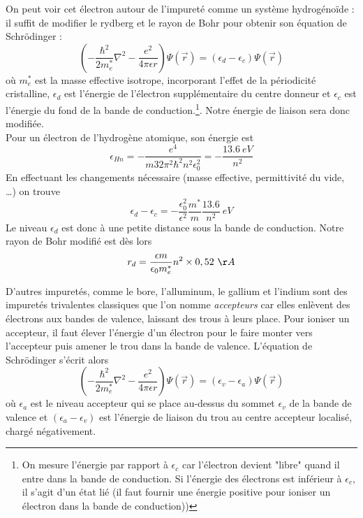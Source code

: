 		On peut voir cet électron autour de l'impureté comme un système hydrogénoïde : 
		il suffit de modifier le rydberg et le rayon de Bohr pour obtenir son équation 
		de Schrödinger :
		\begin{equation}
		\left(-\dfrac{\hbar^2}{2m_e^*}\nabla^2 - \dfrac{e^2}{4\pi\epsilon r}\right)\Psi(
		\vec r)	=(\epsilon_d-\epsilon_c)\Psi(\vec r)
		\end{equation}
		où $m_e^*$ est la masse effective isotrope, incorporant l'effet de la périodicité 
		cristalline, $\epsilon_d$ est l'énergie de l'électron supplémentaire du centre 
		donneur et $\epsilon_c$ est l'énergie du fond de la bande de conduction.\footnote{
		On mesure l'énergie par rapport à $\epsilon_c$ car l'électron devient "libre" quand 
		il entre dans la bande de conduction. Si l'énergie des électrons est inférieur à 
		$\epsilon_c$, il s'agit d'un état lié (il faut fournir une énergie positive pour 
		ioniser un électron dans la bande de conduction))}. Notre énergie de liaison sera 
		donc modifiée.\\
		Pour un électron de l'hydrogène atomique, son énergie est 
		\begin{equation}
		\epsilon_{Hn} = -\dfrac{e^4}{m	32\pi^2\hbar^2n^2\epsilon_0^2} = -\dfrac{13.6\ eV
		}{n^2}
		\end{equation}
		En effectuant les changements nécessaire (masse effective, permittivité du vide, 
		\dots) on trouve 
		\begin{equation}
		\epsilon_d-\epsilon_c = -\dfrac{\epsilon_0^2}{\epsilon^2}\dfrac{m^*}{m}\dfrac{13.6
		}{n^2}\ eV
		\end{equation}
		Le niveau $\epsilon_d$ est donc à une petite distance sous la bande de conduction. 
		Notre rayon de Bohr modifié est dès lors
		\begin{equation}
		r_d = \dfrac{\epsilon m}{\epsilon_0m_e^*}n^2\times 0,52\ \AA
		\end{equation}
		
		D'autres impuretés, comme le bore, l'alluminum, le gallium et l'indium sont des 
		impuretés trivalentes classiques que l'on nomme \textit{accepteurs} car elles 
		enlèvent des électrons aux bandes de valence, laissant des trous à leurs place.
		Pour ioniser un accepteur, il faut élever l'énergie d'un électron pour le faire 
		monter vers l'accepteur puis amener le trou dans la bande de valence. L'équation 
		de Schrödinger s'écrit alors
		\begin{equation}
		\left(-\dfrac{\hbar^2}{2m_e^*}\nabla^2 - \dfrac{e^2}{4\pi\epsilon r}\right)\Psi(
		\vec r)	=(\epsilon_v-\epsilon_a)\Psi(\vec r)		
		\end{equation}
		où $\epsilon_a$ est le niveau accepteur qui se place au-dessus du sommet $\epsilon_v$ 
		de la bande de valence et $(\epsilon_a-\epsilon_v)$ est l'énergie de liaison du trou 
		au centre accepteur localisé, chargé négativement.\\
		
